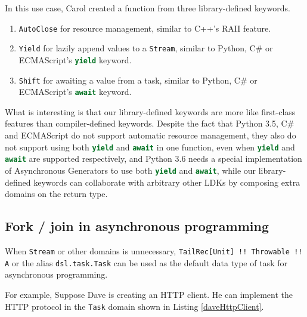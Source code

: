 In this use case, Carol created a function from three library-defined keywords.

\begin{enumerate}
  \item \lstinline{AutoClose} for resource management, similar to C++'s RAII feature.
  \item \lstinline{Yield} for lazily append values to a \lstinline{Stream}, similar to Python, C\# or ECMAScript's \lstinline[language=Python]{yield} keyword.
  \item \lstinline{Shift} for awaiting a value from a task, similar to Python, C\# or ECMAScript's \lstinline[language=Python]{await} keyword.
\end{enumerate}

What is interesting is that our library-defined keywords are more like first-class features than compiler-defined keywords. Despite the fact that Python 3.5, C\# and ECMAScript do not support automatic resource management, they also do not support using both \lstinline[language=Python]{yield} and \lstinline[language=Python]{await} in one function, even when \lstinline[language=Python]{yield} and \lstinline[language=Python]{await} are supported respectively, and Python 3.6 needs a special implementation of Asynchronous Generators \cite{pep525} to use both \lstinline[language=Python]{yield} and \lstinline[language=Python]{await}, while our library-defined keywords can collaborate with arbitrary other LDKs by composing extra domains on the return type.

\subsection{Fork / join in asynchronous programming}

When \lstinline{Stream} or other domains is unnecessary, \lstinline{TailRec[Unit] !! Throwable !! A} or the alias \lstinline{dsl.task.Task} can be used as the default data type of task for asynchronous programming.

For example, Suppose Dave is creating an HTTP client. He can implement the HTTP protocol in the \lstinline{Task} domain shown in Listing \ref{daveHttpClient}.

